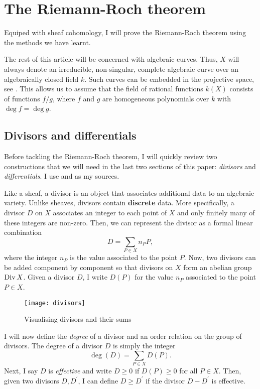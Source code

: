 \section{The Riemann-Roch theorem}
Equiped with sheaf cohomology, I will prove the Riemann-Roch theorem
using the methods we have learnt.
\begin{lnote}
  The rest of this article will be concerned with algebraic curves. Thus,
  $X$ will always denote an irreducible, non-singular, complete algebraic
  curve over an algebraically closed field $k$. Such curves can be embedded
  in the projective space, see \cite{serre}. This allows us to assume that
  the field of rational functions $k(X)$ consists of functions $f/g$, where
  $f$ and $g$ are homogeneous polynomials over $k$ with $\deg f=\deg g$.
\end{lnote}

\subsection{Divisors and differentials}
Before tackling the Riemann-Roch theorem, I will quickly review two
constructions that we will need in the last two sections of this paper:
\emph{divisors} and \emph{differentials}. I use \cite{gathmann}
and \cite{serre} as my sources.

Like a sheaf, a divisor is an object that associates additional data to
an algebraic variety. Unlike sheaves, divisors contain \textbf{discrete}
data. More specifically, a divisor $D$ on $X$ associates an integer to
each point of $X$ and only finitely many of these integers are non-zero.
Then, we can represent the divisor as a formal linear combination
\[
  D=\sum_{P\in X}n_{P}P,
\]
where the integer $n_{P}$ is the value associated to the point $P$.
Now, two divisors can be added component by component so that divisors on
$X$ form an abelian group $\operatorname{Div} X$. Given a divisor $D$, I write $D(P)$
for the value $n_{P}$ associated to the point $P\in X$.
\begin{figure}[H]
  \centering
  \texttt{[image: divisors]}
  \caption{Visualising divisors and their sums}
\end{figure}
I will now define the \emph{degree} of a divisor and an order relation on
the group of divisors. The degree of a divisor $D$ is simply the integer
\[
  \deg(D) = \sum_{P\in X} D(P).
\]
Next, I say $D$ is \emph{effective} and write $D\geq 0$ if $D(P)\geq 0$
for all $P\in X$. Then, given two divisors $D, D^{\prime}$, I can define
$D\geq D^{\prime}$ if the divisor $D-D^{\prime}$ is effective.


